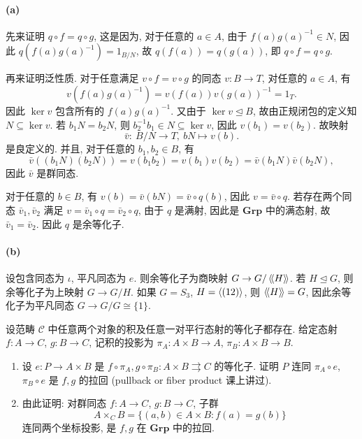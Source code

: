 \documentclass{article}
\begin{document}
\begin{solution}
	\paragraph{(a)} 先来证明 $q \circ f = q \circ g$, 这是因为, 对于任意的 $a \in A$, 由于 $f(a)g(a)^{-1} \in N$, 因此 $q(f(a)g(a)^{-1}) = 1_{B/N}$, 故 $q(f(a)) = q(g(a))$, 即 $q \circ f = q \circ g$. 

	再来证明泛性质. 对于任意满足 $v \circ f = v \circ g$ 的同态 $v: B \to T$, 对任意的 $a \in A$, 有
	\[ v(f(a)g(a)^{-1}) = v(f(a))v(g(a))^{-1} = 1_T. \]
	因此 $\ker v$ 包含所有的 $f(a)g(a)^{-1}$. 又由于 $\ker v \unlhd B$, 故由正规闭包的定义知 $N \subseteq \ker v$. 若 $b_1N = b_2N$, 则 $b_2^{-1}b_1 \in N \subseteq \ker v$, 因此 $v(b_1) = v(b_2)$. 故映射
	\[ \bar{v}: \ B/N \to T, \ bN \mapsto v(b). \]
	是良定义的. 并且, 对于任意的 $b_1, b_2 \in B$, 有
	\[ \bar{v}((b_1N)(b_2N)) = v(b_1b_2) = v(b_1)v(b_2) = \bar{v}(b_1N)\bar{v}(b_2N), \]
	因此 $\bar{v}$ 是群同态.

	对于任意的 $b \in B$, 有 $v(b) = \bar{v}(bN) = \bar{v} \circ q(b)$, 因此 $v = \bar{v} \circ q$. 若存在两个同态 $\bar{v}_1, \bar{v}_2$ 满足 $v = \bar{v}_1 \circ q = \bar{v}_2 \circ q$, 由于 $q$ 是满射, 因此是 $\mathbf{Grp}$ 中的满态射, 故 $\bar{v}_1 = \bar{v}_2$. 因此 $q$ 是余等化子.

	\paragraph{(b)} 设包含同态为 $\iota$, 平凡同态为 $e$. 则余等化子为商映射 $G \to G/\left\langle \!\left\langle H \right\rangle\! \right\rangle$. 若 $H \unlhd G$, 则余等化子为上映射 $G \to G/H$. 如果 $G = S_3$, $H = \left\langle (12) \right\rangle$, 则 $\left\langle \!\left\langle H \right\rangle\! \right\rangle = G$, 因此余等化子为平凡同态 $G \to G/G \cong \{1\}$.
\end{solution}



\begin{problem}
设范畴 $\mathcal C$ 中任意两个对象的积及任意一对平行态射的等化子都存在. 给定态射 $f:A\to C$, $g:B\to C$, 记积的投影为 $\pi_A:A\times B\to A$, $\pi_B:A\times B\to B$.
\begin{enumerate}
  \item[(a)] 设 $e:P\to A\times B$ 是 $f\circ\pi_A,g\circ\pi_B:A\times B\rightrightarrows C$ 的等化子. 证明 $P$ 连同 $\pi_A\circ e$, $\pi_B\circ e$ 是 $f,g$ 的拉回 (pullback or fiber product 课上讲过).
  \item[(b)] 由此证明: 对群同态 $f:A\to C$, $g:B\to C$, 子群
  \[
    A\times_C B=\{(a,b)\in A\times B:f(a)=g(b)\}
  \]
  连同两个坐标投影, 是 $f,g$ 在 $\mathbf{Grp}$ 中的拉回.
\end{enumerate}
\end{problem}
\end{document}
